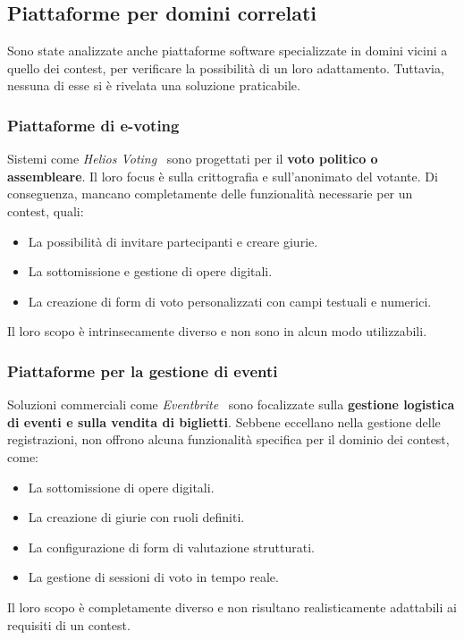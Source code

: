 \subsection{Piattaforme per domini correlati}\label{subsec:piattaforme-per-domini-correlati}
Sono state analizzate anche piattaforme software specializzate in domini vicini a quello dei contest, per verificare la possibilità di un loro adattamento.
Tuttavia, nessuna di esse si è rivelata una soluzione praticabile.

\subsubsection{Piattaforme di e-voting}
Sistemi come \textit{Helios Voting}~\cite{helios_voting} sono progettati per il \textbf{voto politico o assembleare}.
Il loro focus è sulla crittografia e sull'anonimato del votante.
Di conseguenza, mancano completamente delle funzionalità necessarie per un contest, quali:
\begin{itemize}
    \item La possibilità di invitare partecipanti e creare giurie.
    \item La sottomissione e gestione di opere digitali.
    \item La creazione di form di voto personalizzati con campi testuali e numerici.
\end{itemize}
Il loro scopo è intrinsecamente diverso e non sono in alcun modo utilizzabili.

\subsubsection{Piattaforme per la gestione di eventi}
Soluzioni commerciali come \textit{Eventbrite}~\cite{eventbrite_website} sono focalizzate sulla \textbf{gestione logistica di eventi e sulla vendita di biglietti}.
Sebbene eccellano nella gestione delle registrazioni, non offrono alcuna funzionalità specifica per il dominio dei contest, come:
\begin{itemize}
    \item La sottomissione di opere digitali.
    \item La creazione di giurie con ruoli definiti.
    \item La configurazione di form di valutazione strutturati.
    \item La gestione di sessioni di voto in tempo reale.
\end{itemize}
Il loro scopo è completamente diverso e non risultano realisticamente adattabili ai requisiti di un contest.

